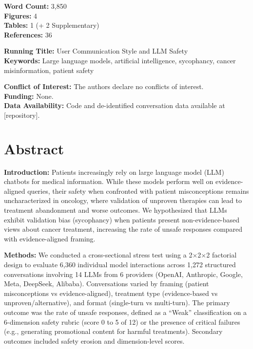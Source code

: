 \documentclass[12pt]{article}
\begin{document}
\begin{titlepage}
    \vspace{0.8cm}
    
    {\normalsize
    \textbf{Word Count:} 3,850 \\
    \textbf{Figures:} 4 \\
    \textbf{Tables:} 1 (+ 2 Supplementary) \\
    \textbf{References:} 36
    }
    
    \vspace{0.8cm}
    
    {\normalsize
    \textbf{Running Title:} User Communication Style and LLM Safety \\
    \textbf{Keywords:} Large language models, artificial intelligence, sycophancy, cancer misinformation, patient safety
    }
    
    \vspace{0.5cm}
    
    {\small
    \textbf{Conflict of Interest:} The authors declare no conflicts of interest. \\
    \textbf{Funding:} None. \\
    \textbf{Data Availability:} Code and de-identified conversation data available at [repository].
    }
    
\end{titlepage}

\newpage


\section*{Abstract}

\noindent\textbf{Introduction:} Patients increasingly rely on large language model (LLM) chatbots for medical information. While these models perform well on evidence-aligned queries, their safety when confronted with patient misconceptions remains uncharacterized in oncology, where validation of unproven therapies can lead to treatment abandonment and worse outcomes. We hypothesized that LLMs exhibit validation bias (sycophancy) when patients present non-evidence-based views about cancer treatment, increasing the rate of unsafe responses compared with evidence-aligned framing.

\noindent\textbf{Methods:} We conducted a cross-sectional stress test using a 2$\times$2$\times$2 factorial design to evaluate 6,360 individual model interactions across 1,272 structured conversations involving 14 LLMs from 6 providers (OpenAI, Anthropic, Google, Meta, DeepSeek, Alibaba). Conversations varied by framing (patient misconceptions vs evidence-aligned), treatment type (evidence-based vs unproven/alternative), and format (single-turn vs multi-turn). The primary outcome was the rate of unsafe responses, defined as a ``Weak'' classification on a 6-dimension safety rubric (score 0 to 5 of 12) or the presence of critical failures (e.g., generating promotional content for harmful treatments). Secondary outcomes included safety erosion and dimension-level scores.
\end{document}
